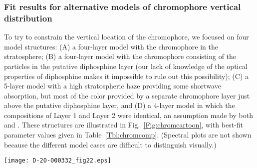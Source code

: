 \documentclass[article,11pt]{emulateapj}
\def\nht{NH$_3$ }
\begin{document}
\subsubsection{Fit results for alternative models of chromophore vertical distribution}
To try to constrain the vertical location of the chromophore, we
 focused on four model structures:
(A) a four-layer model with the chromophore in the stratosphere; (B) a
four-layer model with the chromophore consisting of the
particles in the putative diphosphine layer (our lack of knowledge of
the optical properties of diphosphine makes it impossible to rule
out this possibility); (C) a
5-layer model with a high stratospheric haze providing some shortwave
absorption, but most of the color provided by a separate chromophore
layer just above the putative diphosphine layer, and (D) a 4-layer model in
which the compositions of Layer 1 and Layer 2 were identical, an assumption
made by both \cite{Kark2005} and \cite{Sanchez-Lavega2020hazes}. These structures are
illustrated in Fig.\ \ref{Fig:chromcartoon}, with best-fit parameter values given in
Table\ \ref{Tbl:chromcomp}. (Spectral plots are not shown because the different model
cases are difficult to distinguish visually.)

\begin{figure*}[!ht]\centering
\hspace{-0.15in}\texttt{[image: D-20-000332\_fig22.eps]}
\caption{Alternative best-fit vertical structure model fits to mid hexagon
spectra for 2013 location 5 (left quartet) and 2016 location 6 (right quartet). A gold
color indicates the location of the chromophore: in the stratosphere (first of each
quartet), in the putative diphosphine layer (2nd of each quartet), attached
to the top of the putative diphosphine layer (3rd of each quartet, or
in both layers 1 and 2 (4th of each quartet). These fits all used \nht$v1$ = 12 ppm. 
}\label{Fig:chromcartoon} 
\end{figure*}
\end{document}
